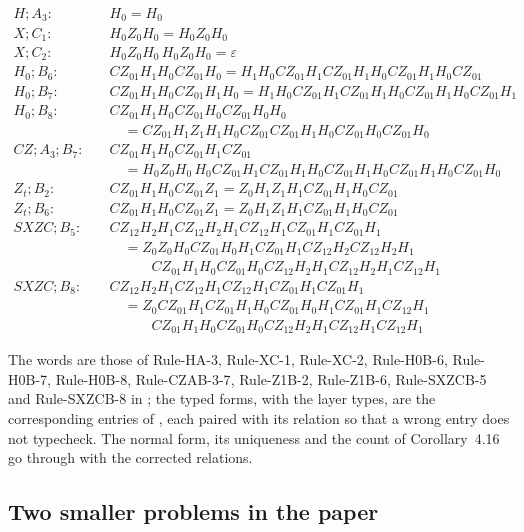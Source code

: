 \documentclass[11pt]{article}
\newcommand{\aid}[1]{\mbox{\textsf{\small #1}}}
\begin{document}
\begin{align*}
H;A_3:\quad & H_0 = H_0 \\
X;C_1:\quad & H_0Z_0H_0 = H_0Z_0H_0 \\
X;C_2:\quad & H_0Z_0H_0\,H_0Z_0H_0 = \varepsilon \\
H_0;B_6:\quad & CZ_{01}H_1H_0CZ_{01}H_0 = H_1H_0CZ_{01}H_1CZ_{01}H_1H_0CZ_{01}H_1H_0CZ_{01} \\
H_0;B_7:\quad & CZ_{01}H_1H_0CZ_{01}H_1H_0 = H_1H_0CZ_{01}H_1CZ_{01}H_1H_0CZ_{01}H_1H_0CZ_{01}H_1 \\
H_0;B_8:\quad & CZ_{01}H_1H_0CZ_{01}H_0CZ_{01}H_0H_0 \\
 & \quad = CZ_{01}H_1Z_1H_1H_0CZ_{01}CZ_{01}H_1H_0CZ_{01}H_0CZ_{01}H_0 \\
CZ;A_3;B_7:\quad & CZ_{01}H_1H_0CZ_{01}H_1CZ_{01} \\
 & \quad = H_0Z_0H_0\,H_0CZ_{01}H_1CZ_{01}H_1H_0CZ_{01}H_1H_0CZ_{01}H_1H_0CZ_{01}H_0 \\
Z_t;B_2:\quad & CZ_{01}H_1H_0CZ_{01}Z_1 = Z_0H_1Z_1H_1CZ_{01}H_1H_0CZ_{01} \\
Z_t;B_6:\quad & CZ_{01}H_1H_0CZ_{01}Z_1 = Z_0H_1Z_1H_1CZ_{01}H_1H_0CZ_{01} \\
SXZC;B_5:\quad & CZ_{12}H_2H_1CZ_{12}H_2H_1CZ_{12}H_1CZ_{01}H_1CZ_{01}H_1 \\
 & \quad = Z_0Z_0H_0CZ_{01}H_0H_1CZ_{01}H_1CZ_{12}H_2CZ_{12}H_2H_1 \\
 & \qquad\quad CZ_{01}H_1H_0CZ_{01}H_0CZ_{12}H_2H_1CZ_{12}H_2H_1CZ_{12}H_1 \\
SXZC;B_8:\quad & CZ_{12}H_2H_1CZ_{12}H_1CZ_{12}H_1CZ_{01}H_1CZ_{01}H_1 \\
 & \quad = Z_0CZ_{01}H_1CZ_{01}H_1H_0CZ_{01}H_0H_1CZ_{01}H_1CZ_{12}H_1 \\
 & \qquad\quad CZ_{01}H_1H_0CZ_{01}H_0CZ_{12}H_2H_1CZ_{12}H_1CZ_{12}H_1
\end{align*}

The words are those of \aid{Rule-HA-3}, \aid{Rule-XC-1},
\aid{Rule-XC-2}, \aid{Rule-H0B-6}, \aid{Rule-H0B-7}, \aid{Rule-H0B-8},
\aid{Rule-CZAB-3-7}, \aid{Rule-Z1B-2}, \aid{Rule-Z1B-6},
\aid{Rule-SXZCB-5} and \aid{Rule-SXZCB-8} in
; the typed forms, with the
layer types, are the corresponding entries of
, each paired with its relation so that a
wrong entry does not typecheck. The normal form, its uniqueness and
the count of Corollary~4.16 go through with the corrected relations.

\subsection{Two smaller problems in the paper}
\end{document}
